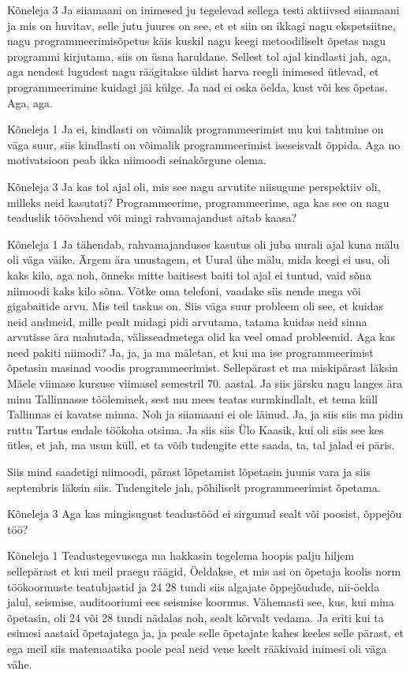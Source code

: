 Kõneleja 3
Ja siiamaani on inimesed ju tegelevad sellega testi aktiivsed siiamaani ja mis on huvitav, selle jutu juures on see, et et siin on ikkagi nagu ekspetsiitne, nagu programmeerimisõpetus käis kuskil nagu keegi metoodiliselt õpetas nagu programmi kirjutama, siis on üsna haruldane. Sellest tol ajal kindlasti jah, aga, aga nendest lugudest nagu räägitakse üldist harva reegli inimesed ütlevad, et programmeerimine kuidagi jäi külge. Ja nad ei oska öelda, kust või kes õpetas. Aga, aga. 

Kõneleja 1
Ja ei, kindlasti on võimalik programmeerimist mu kui tahtmine on väga suur, siis kindlasti on võimalik programmeerimist iseseisvalt õppida. Aga no motivatsioon peab ikka niimoodi seinakõrgune olema. 

Kõneleja 3
Ja kas tol ajal oli, mis see nagu arvutite niisugune perspektiiv oli, milleks neid kasutati? Programmeerime, programmeerime, aga kas see on nagu teaduslik töövahend või mingi rahvamajandust aitab kaasa? 

Kõneleja 1
Ja tähendab, rahvamajanduses kasutus oli juba uurali ajal kuna mälu oli väga väike. Ärgem ära unustagem, et Uural ühe mälu, mida keegi ei usu, oli kaks kilo, aga noh, õnneks mitte baitisest baiti tol ajal ei tuntud, vaid sõna niimoodi kaks kilo sõna. Võtke oma telefoni, vaadake siis nende mega või gigabaitide arvu. Mis teil taskus on. Siis väga suur probleem oli see, et kuidas neid andmeid, mille pealt midagi pidi arvutama, tatama kuidas neid sinna arvutisse ära mahutada, välisseadmetega olid ka veel omad probleemid. Aga kas need pakiti niimodi? Ja, ja, ja ma mäletan, et kui ma ise programmeerimist õpetasin masinad voodis programmeerimist. Sellepärast et ma miskipärast läksin Mäele viimase kursuse viimasel semestril 70. aastal. Ja siis järsku nagu langes ära minu Tallinnasse tööleminek, sest mu mees teatas surmkindlalt, et tema küll Tallinnas ei kavatse minna. Noh ja siiamaani ei ole läinud. Ja, ja siis siis ma pidin ruttu Tartus endale töökoha otsima. Ja siis siis Ülo Kaasik, kui oli siis see kes ütles, et jah, ma usun küll, et ta võib tudengite ette saada, ta, tal jalad ei päris. 

Siis mind saadetigi niimoodi, pärast lõpetamist lõpetasin juunis vara ja siis septembris läksin siis. Tudengitele jah, põhiliselt programmeerimist õpetama. 

Kõneleja 3
Aga kas mingisugust teadustööd ei sirgunud sealt või poosist, õppejõu töö? 

Kõneleja 1
Teadustegevusega ma hakkasin tegelema hoopis palju hiljem sellepärast et kui meil praegu räägid, Öeldakse, et mis asi on õpetaja koolis norm töökoormuste teatubjastid ja 24 28 tundi siis algajate õppejõudude, nii-öelda jalul, seismise, auditooriumi ees seismise koormus. Vähemasti see, kus, kui mina õpetasin, oli 24 või 28 tundi nädalas noh, sealt kõrvalt vedama. Ja eriti kui ta esimesi aastaid õpetajatega ja, ja peale selle õpetajate kahes keeles selle pärast, et ega meil siis matemaatika poole peal neid vene keelt rääkivaid inimesi oli väga vähe. 

